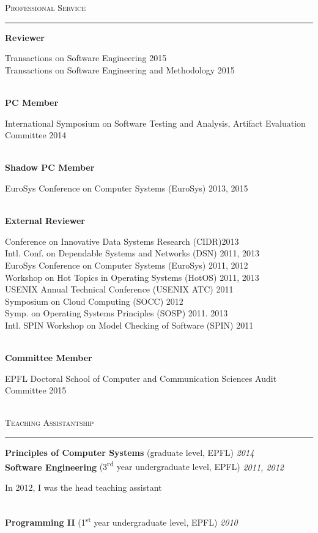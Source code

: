\documentclass[10pt]{article}
\newcommand{\mysec}[1]{\vspace{2em}\textsc{\large #1}\vspace{1mm}\hrule\vspace{2mm}}
\newcommand{\mysub}[3]{\textbf{#1} {#2} \hfill {\em #3}}
\newcommand{\myssub}[1]{\hspace*{2mm}\parbox{163mm}{#1}\vspace*{2mm}}
\begin{document}
\mysec{Professional Service}

\mysub{Reviewer}{}{} \\
\myssub{\vspace{2mm}Transactions on Software Engineering \hfill 2015 \\
Transactions on Software Engineering and Methodology \hfill 2015} \\
\mysub{PC Member}{}{}\\
\myssub{\vspace{2mm}International Symposium on Software Testing and Analysis, Artifact Evaluation Committee \hfill 2014} \\
\mysub{Shadow PC Member}{}{} \\ 
\myssub{\vspace{2mm}EuroSys Conference on Computer Systems (EuroSys) \hfill 2013, 2015} \\
\mysub{External Reviewer}{}{} \\ 
\myssub{\vspace{2mm}Conference on Innovative Data Systems Research (CIDR)\hfill 2013\\
Intl. Conf. on Dependable Systems and Networks (DSN) \hfill 2011, 2013 \\
EuroSys Conference on Computer Systems (EuroSys) \hfill 2011, 2012 \\
Workshop on Hot Topics in Operating Systems (HotOS) \hfill 2011, 2013 \\
USENIX Annual Technical Conference (USENIX ATC) \hfill 2011 \\
Symposium on Cloud Computing (SOCC) \hfill 2012 \\
Symp. on Operating Systems Principles (SOSP) \hfill 2011. 2013 \\
Intl. SPIN Workshop on Model Checking of Software (SPIN) \hfill 2011} \\

\mysub{Committee Member}{}{} \\
\myssub{\vspace{2mm}EPFL Doctoral School of Computer and Communication Sciences Audit Committee \hfill 2015}\\

\mysec{Teaching Assistantship}

\mysub{Principles of Computer Systems}{(graduate level, EPFL)}{\rm 2014\vspace{2mm}} \\
\mysub{Software Engineering}{(3\textsuperscript{rd} year undergraduate level, EPFL)}{\rm 2011, 2012} \\
\myssub{In 2012, I was the head teaching assistant}\\
\mysub{Programming II}{(1\textsuperscript{st} year undergraduate level, EPFL)}{\rm 2010}
\end{document}
